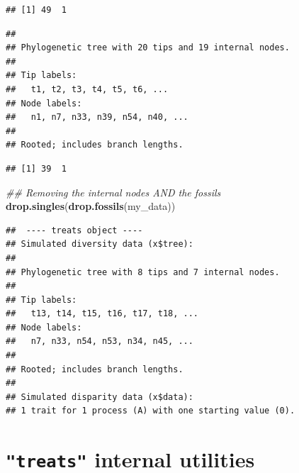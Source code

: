 \documentclass[
]{book}
\newenvironment{Shaded}{\begin{snugshade}}{\end{snugshade}}
\newcommand{\CommentTok}[1]{\textcolor[rgb]{0.56,0.35,0.01}{\textit{#1}}}
\newcommand{\DataTypeTok}[1]{\textcolor[rgb]{0.13,0.29,0.53}{#1}}
\newcommand{\KeywordTok}[1]{\textcolor[rgb]{0.13,0.29,0.53}{\textbf{#1}}}
\newcommand{\NormalTok}[1]{#1}
\newcommand{\OperatorTok}[1]{\textcolor[rgb]{0.81,0.36,0.00}{\textbf{#1}}}
\newcommand{\StringTok}[1]{\textcolor[rgb]{0.31,0.60,0.02}{#1}}
\begin{document}
\begin{verbatim}
## [1] 49  1
\end{verbatim}

\begin{Shaded}
\end{Shaded}

\begin{verbatim}
## 
## Phylogenetic tree with 20 tips and 19 internal nodes.
## 
## Tip labels:
##   t1, t2, t3, t4, t5, t6, ...
## Node labels:
##   n1, n7, n33, n39, n54, n40, ...
## 
## Rooted; includes branch lengths.
\end{verbatim}

\begin{Shaded}
\end{Shaded}

\begin{verbatim}
## [1] 39  1
\end{verbatim}

\begin{Shaded}
\begin{Highlighting}[]
\CommentTok{\#\# Removing the internal nodes AND the fossils}
\KeywordTok{drop.singles}\NormalTok{(}\KeywordTok{drop.fossils}\NormalTok{(my\_data))}
\end{Highlighting}
\end{Shaded}

\begin{verbatim}
##  ---- treats object ---- 
## Simulated diversity data (x$tree):
## 
## Phylogenetic tree with 8 tips and 7 internal nodes.
## 
## Tip labels:
##   t13, t14, t15, t16, t17, t18, ...
## Node labels:
##   n7, n33, n54, n53, n34, n45, ...
## 
## Rooted; includes branch lengths.
## 
## Simulated disparity data (x$data):
## 1 trait for 1 process (A) with one starting value (0).
\end{verbatim}

\hypertarget{treats-internal-utilities}{%
\section{\texorpdfstring{\texttt{"treats"} internal utilities}{"treats" internal utilities}}\label{treats-internal-utilities}}
\end{document}

